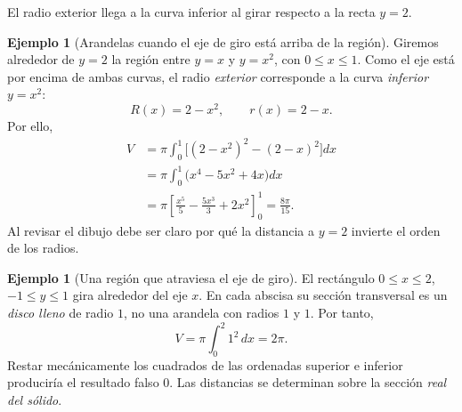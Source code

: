 \documentclass[12pt]{article}
\theoremstyle{definition}
\newtheorem{ejemplo}[teorema]{Ejemplo}
\theoremstyle{remark}
\begin{document}
\begin{center}

{\small El radio exterior llega a la curva inferior al girar respecto a la recta $y=2$.}
\end{center}

\begin{ejemplo}[Arandelas cuando el eje de giro está arriba de la región]
Giremos alrededor de $y=2$ la región entre $y=x$ y $y=x^2$, con $0\le x\le1$. Como el eje está por encima de ambas curvas, el radio \emph{exterior} corresponde a la curva \emph{inferior} $y=x^2$:
\[
R(x)=2-x^2,\qquad r(x)=2-x.
\]
Por ello,
\begin{align*}
V&=\pi\int_0^1\bigl[(2-x^2)^2-(2-x)^2\bigr]dx\\
&=\pi\int_0^1\bigl(x^4-5x^2+4x\bigr)dx\\
&=\pi\left[\frac{x^5}{5}-\frac{5x^3}{3}+2x^2\right]_0^1
=\boxed{\frac{8\pi}{15}}.
\end{align*}
Al revisar el dibujo debe ser claro por qué la distancia a $y=2$ invierte el orden de los radios.
\end{ejemplo}
\begin{ejemplo}[Una región que atraviesa el eje de giro]
El rectángulo $0\le x\le2$, $-1\le y\le1$ gira alrededor del eje $x$. En cada abscisa su sección transversal es un \emph{disco lleno} de radio $1$, no una arandela con radios $1$ y $1$. Por tanto,
\[V=\pi\int_0^2 1^2\,dx=\boxed{2\pi}.\]
Restar mecánicamente los cuadrados de las ordenadas superior e inferior produciría el resultado falso $0$. Las distancias se determinan sobre la sección \emph{real del sólido}.
\end{ejemplo}
\end{document}
